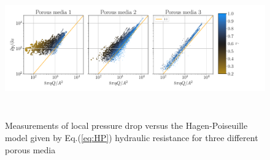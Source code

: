 \documentclass[draft]{agujournal2019}
\begin{document}
\begin{figure}
\includegraphics[height=6cm]{figures/infi_dpdx_3.pdf}
\caption{Measurements of local pressure drop versus the Hagen-Poiseuille model given by Eq.(\ref{eq:HP}) hydraulic resistance for three different porous media}
\label{fig:local_pressure_drop}
\end{figure}
\end{document}
